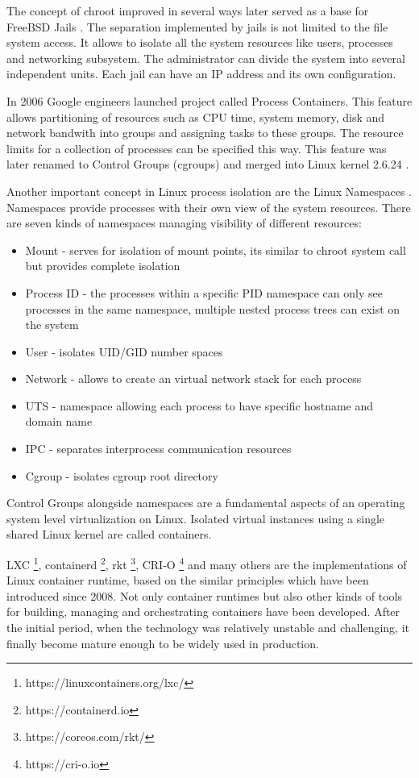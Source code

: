 \documentclass[
  digital, %
  twoside, %
  table,   %
  lof,     %
  lot,     %
]{fithesis3}
\begin{document}
The concept of chroot improved in several ways later served as a base for FreeBSD Jails \cite{freebsd_jails}. The separation implemented by jails is not limited to the file system access. It allows to isolate all the system resources like users, processes and networking subsystem. The administrator can divide the system into several independent units. Each jail can have an IP address and its own configuration.

In 2006 Google engineers launched project called Process Containers. This feature allows partitioning of resources such as CPU time, system memory, disk and network bandwith into groups and assigning tasks to these groups. The resource limits for a collection of processes can be specified this way. This feature was later renamed to Control Groups (cgroups) and merged into Linux kernel 2.6.24 \cite{cgroups}.

Another important concept in Linux process isolation are the Linux Namespaces \cite{namespaces}. Namespaces provide processes with their own view of the system resources. There are seven kinds of namespaces managing visibility of different resources:
\begin{itemize}
  \item Mount - serves for isolation of mount points, its similar to chroot system call but provides complete isolation
  \item Process ID - the processes within a specific PID namespace can only see processes in the same namespace, multiple nested process trees can exist on the system
  \item User - isolates UID/GID number spaces
  \item Network - allows to create an virtual network stack for each process
  \item UTS - namespace allowing each process to have specific hostname and domain name
  \item IPC - separates interprocess communication resources
  \item Cgroup - isolates cgroup root directory
\end{itemize}

Control Groups alongside namespaces are a fundamental aspects of an operating system level virtualization on Linux. Isolated virtual instances using a single shared Linux kernel are called containers.

LXC \footnote{https://linuxcontainers.org/lxc/}, containerd \footnote{https://containerd.io}, rkt \footnote{https://coreos.com/rkt/}, CRI-O \footnote{https://cri-o.io} and many others are the implementations of Linux container runtime, based on the similar principles which have been introduced since 2008. Not only container runtimes but also other kinds of tools for building, managing and orchestrating containers have been developed. After the initial period, when the technology was relatively unstable and challenging, it finally become mature enough to be widely used in production.
\end{document}
